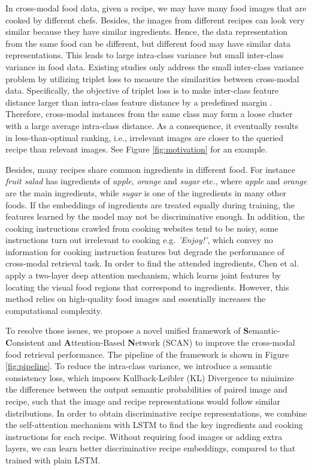 \documentclass[journal]{IEEEtran}
\begin{document}
In cross-modal food data, given a recipe, we may have many food images that are cooked by different chefs. Besides, the images from different recipes can look very similar because they have similar ingredients. Hence, the data representation from the same food can be different, but different food may have similar data representations. This leads to large intra-class variance but small inter-class variance in food data. Existing studies \cite{carvalho2018cross,chen2018deep,chen2017cross} only address the small inter-class variance problem by utilizing triplet loss to measure the similarities between cross-modal data. Specifically, the objective of triplet loss is to make inter-class feature distance larger than intra-class feature distance by a predefined margin \cite{cheng2016person}. Therefore, cross-modal instances from the same class may form a loose cluster with a large average intra-class distance. As a consequence, it eventually results in less-than-optimal ranking, i.e., irrelevant images are closer to the queried recipe than relevant images. See Figure \ref{fig:motivation} for an example.

Besides, many recipes share common ingredients in different food. For instance \emph{fruit salad} has ingredients of \emph{apple}, \emph{orange} and \emph{sugar} etc., where \emph{apple} and \emph{orange} are the main ingredients, while \emph{sugar} is one of the ingredients in many other foods. If the embeddings of ingredients are treated equally during training, the features learned by the model may not be discriminative enough. In addition, the cooking instructions crawled from cooking websites tend to be noisy, some instructions turn out irrelevant to cooking e.g. \emph{'Enjoy!'}, which convey no information for cooking instruction features but degrade the performance of cross-modal retrieval task. In order to find the attended ingredients, Chen et al. \cite{chen2017cross} apply a two-layer deep attention mechanism, which learns joint features by locating the visual food regions that correspond to ingredients. However, this method relies on high-quality food images and essentially increases the computational complexity.

To resolve those issues, we propose a novel unified framework of \textbf{S}emantic-\textbf{C}onsistent and \textbf{A}ttention-Based \textbf{N}etwork (SCAN) to improve the cross-modal food retrieval performance. The pipeline of the framework is shown in Figure \ref{fig:pipeline}. To reduce the intra-class variance, we introduce a semantic consistency loss, which imposes Kullback-Leibler (KL) Divergence to minimize the difference between the output semantic probabilities of paired image and recipe, such that the image and recipe representations would follow similar distributions. In order to obtain discriminative recipe representations, we combine the self-attention mechanism \cite{vaswani2017attention} with LSTM to find the key ingredients and cooking instructions for each recipe. Without requiring food images or adding extra layers, we can learn better discriminative recipe embeddings, compared to that trained with plain LSTM. 
\end{document}
